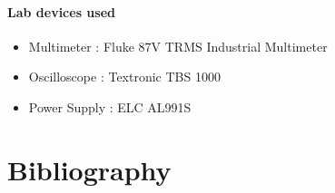 \documentclass{article}[12pt]
\begin{document}
\paragraph{Lab devices used}
\begin{itemize}
    \item Multimeter : Fluke 87V TRMS Industrial Multimeter
    \item Oscilloscope : Textronic TBS 1000
    \item Power Supply :  ELC AL991S

\end{itemize}
\newpage
\section{Bibliography}


\newpage
\end{document}
